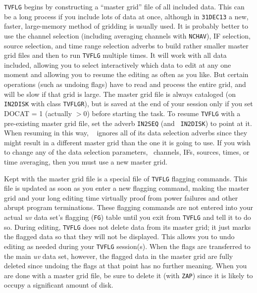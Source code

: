      {\tt TVFLG} begins by constructing a ``master grid'' file of all
included data.  This can be a long process if you include lots of data
at once, although in {\tt 31DEC13} a new, faster, large-memory method
of gridding is usually used.  It is probably better to use the channel
selection (including averaging channels with {\tt NCHAV}), IF
selection, source selection, and time range selection adverbs to build
rather smaller master grid files and then to run {\tt TVFLG} multiple
times.  It will work with all data included, allowing you to select
interactively which data to edit at any one moment and allowing you to
resume the editing as often as you like.  But certain operations (such
as undoing flags) have to read and process the entire grid, and will
be slow if that grid is large.  The master grid file is always
cataloged (on {\tt IN2DISK} with class {\tt TVFLGR}), but is saved at
the end of your session only if you set {\us DOCAT = 1} (actually $ >
0$) before starting the task.  To resume {\tt TVFLG} with a
pre-existing master grid file, set the adverb {\tt IN2SEQ} (and {\tt
IN2DISK}) to point at it.  When resuming in this way, {\tt
{}} ignores all of its data selection adverbs since they
might result in a different master grid than the one it is going to
use.  If you wish to change any of the data selection parameters, \eg\
channels, IFs, sources, times, or time averaging, then you must use a
new master grid.\Iodx{editing}\Iodx{flagging}

     Kept with the master grid file is a special file of {\tt TVFLG}
flagging commands.  This file is updated as soon as you enter a new
flagging command, making the master grid and your long editing time
virtually proof from power failures and other abrupt program
terminations.  These flagging commands are not entered into your
actual {\it uv\/} data set's flagging ({\tt FG}) table until you exit
from {\tt TVFLG} and tell it to do so.  During editing, {\tt TVFLG}
does not delete data from its master grid; it just marks the flagged
data so that they will not be displayed.  This allows you to undo
editing as needed during your {\tt TVFLG} session(s).  When the flags
are transferred to the main {\it uv\/} data set, however, the flagged
data in the master grid are fully deleted since undoing the flags at
that point has no further meaning.  When you are done with a master
grid file, be sure to delete it (with {\tt ZAP}) since it is likely to
occupy a significant amount of disk.\iodx{VLA}

